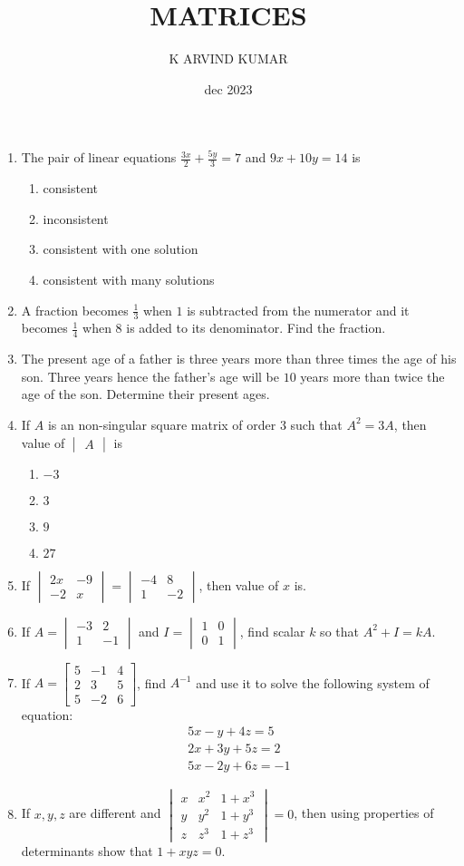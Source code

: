 \documentclass[12pt,-letter paper]{article}
\title{MATRICES}
\author{K ARVIND KUMAR}
\date{dec 2023}
\providecommand{\mydet}[1]{\ensuremath{\begin{vmatrix}#1\end{vmatrix}}}
\providecommand{\myvec}[1]{\ensuremath{\begin{bmatrix}#1\end{bmatrix}}}
\begin{document}
\maketitle
\begin{enumerate}
\item The pair of linear equations
$\frac{3x}{2}+\frac{5y}{3}=7$ and $9x+10y=14$ is
\begin{enumerate}[label=(\alph*)]
\item consistent
\item inconsistent
\item consistent with one solution 
\item consistent with many solutions 
\end{enumerate}
\item A fraction becomes $\frac{1}{3}$ when $1$ is subtracted from the numerator and it becomes $\frac{1}{4}$ when $8$ is added to its denominator. Find the fraction.
\item The present age of a father is three years more than three times the age of his son. Three years hence the father's age will be $10$ years more than twice the age of the son. Determine their present ages.
\item If $A$ is an non-singular square matrix  of order $3$ such that $A^2=3A$, then value of $\mydet{A}$ is\\
\begin{enumerate}[label=(\alph*)]
\item $-3$
\item $3$
\item $9$
\item $27$
\end{enumerate}
\item If $\mydet{2x&-9\\ -2&x}=\mydet{-4&8\\ 1&-2}$, then value of $x$ is. 	
\item If $A=\mydet{-3&2\\ 1&-1}$ and $I=\mydet{1&0\\ 0&1}$, find scalar $k$ so that $A^2+I=kA$.
\item If $A= \myvec{5&-1&4\\ 2&3&5\\ 5&-2&6}$, find $A^{-1}$ and use it to solve the following system of equation: 
		\begin{align}
			5x-y+4z=5\\
			2x+3y+5z=2\\
			5x-2y+6z=-1
		\end{align}
\item If $x,y,z$ are different and $\mydet{x&x^{2}&1+x^{3}\\ y&y^{2}&1+y^{3}\\ z&z^{3}&1+z^{3}}=0$, then using properties of determinants show that $1+xyz=0$.
\end{enumerate}
\end{document}
